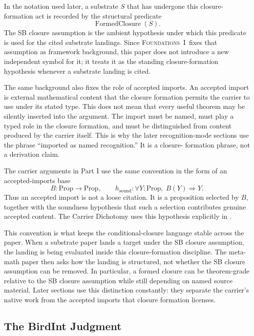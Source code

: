 \documentclass[11pt]{article}
\newcommand{\FOne}{\textsc{Foundations~I}}
\theoremstyle{definition}
\begin{document}
In the notation used later, a substrate \(S\) that has undergone this
closure-formation act is recorded by the structural predicate
\[
  \operatorname{FormedClosure}(S).
\]
The SB closure assumption is the ambient hypothesis under which this
predicate is used for the cited substrate landings.  Since \FOne\ fixes
that assumption as framework background, this paper does not introduce a
new independent symbol for it; it treats it as the standing
closure-formation hypothesis whenever a substrate landing is cited.

The same background also fixes the role of accepted imports.  An
accepted import is external mathematical content that the closure
formation permits the carrier to use under its stated type.  This does
not mean that every useful theorem may be silently inserted into the
argument.  The import must be named, must play a typed role in the
closure formation, and must be distinguished from content produced by
the carrier itself.  This is why the later recognition-mode sections
use the phrase ``imported as named recognition.''  It is a closure-
formation phrase, not a derivation claim.

The carrier arguments in Part I use the same convention in the form of
an accepted-imports base
\[
  B:\mathrm{Prop}\to\mathrm{Prop},\qquad
  h_{\mathrm{sound}}:\forall Y:\mathrm{Prop},\; B(Y)\Rightarrow Y.
\]
Thus an accepted import is not a loose citation.  It is a proposition
selected by \(B\), together with the soundness hypothesis that such a
selection contributes genuine accepted content.  The Carrier Dichotomy
uses this hypothesis explicitly in .

This convention is what keeps the conditional-closure language stable
across the paper.  When a substrate paper lands a target under the SB
closure assumption, the landing is being evaluated inside this
closure-formation discipline.  The meta-math paper then asks how the
landing is structured, not whether the SB closure assumption can be
removed.  In particular, a formed closure can be theorem-grade
relative to the SB closure assumption while still depending on named
source material.  Later sections use this distinction constantly:
they separate the carrier's native work from the accepted imports that
closure formation licenses.

\subsection{The BirdInt Judgment}\label{sec:apparatus:birdint}
\end{document}
